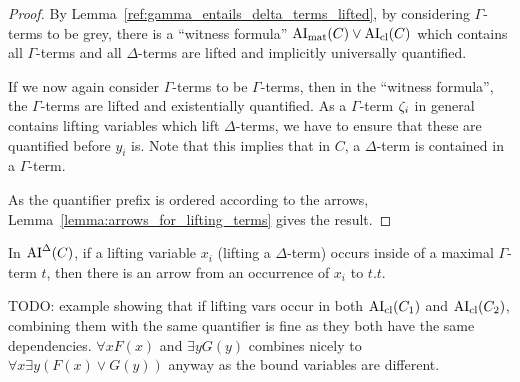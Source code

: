 \documentclass[,%
	paper=a4,%
	DIV12, %
	twoside=false,%
	liststotoc,
	bibtotoc,
	draft=false,%
	numbers=noendperiod
]{scrartcl}
\begin{document}
\begin{proof}
\begin{comment}
				$\Gamma \entails Q_1' z_1' \dots Q_{m'}' z_{m'}' \Big( \AImatrix(C_2) \lor \clauseTwoPrime \lor {\lnot (l{\fromclause'})_\Gamma} \Big)$
				\bigskip


				By the previous proof:

				$\Gamma \stackrel{\markA}\entails Q_1 z_1 \dots Q_m z_m \Big(\lifboth{\AImatrix(C_1)\sigma}\tau \lor \lifboth{\clauseOnePrime\sigma}\tau \lor \lifboth{(l{\fromclause})_\Gamma\sigma}\tau \Big)$

				$\Gamma \stackrel{\markB}\entails Q_1' z_1' \dots Q_{m'}' z_{m'}' \Big(  \lifboth{\AImatrix(C_2)\sigma}\tau \lor \lifboth{\clauseTwoPrime\sigma}\tau \lor \lnot \lifboth{(l{\fromclause'})_\Gamma\sigma}\tau \Big)$

		\end{description}
	\end{comment}

	By Lemma~\ref{ref:gamma_entails_delta_terms_lifted}, by considering $\Gamma$-terms to be grey, there is a ``witness formula'' 
	$\operatorname{AI}_\mathrm{mat}(C) \lor \operatorname{AI}_\mathrm{cl}(C)$ which contains all $\Gamma$-terms and all $\Delta$-terms are lifted and implicitly universally quantified.

	If we now again consider $\Gamma$-terms to be $\Gamma$-terms, then in the ``witness formula'', the $\Gamma$-terms are lifted and existentially quantified.
	As a $\Gamma$-term $\zeta_{i}$ in general contains lifting variables which lift $\Delta$-terms, we have to ensure that these are quantified before $y_i$ is.
	Note that this implies that in $C$, a $\Delta$-term is contained in a $\Gamma$-term.

	As the quantifier prefix is ordered according to the arrows, Lemma~\ref{lemma:arrows_for_lifting_terms} gives the result. 
\end{proof}

\begin{conj}
	\label{lemma:arrows_for_lifting_terms}
	In $\operatorname{AI}^\Delta(C)$, if a lifting variable $x_i$ (lifting a $\Delta$-term)
	occurs inside of a maximal $\Gamma$-term $t$, 
	then there is an arrow from an occurrence of $x_i$ to $t$.$t$.
\end{conj}

\begin{exa}
	TODO: example showing that if lifting vars occur in both $\operatorname{AI}_\mathrm{cl}(C_1)$ and $\operatorname{AI}_\mathrm{cl}(C_2)$, combining them with the same quantifier is fine as they both have the same dependencies. $\forall x F(x)$ and $\exists y G(y)$ combines nicely to $\forall x\exists y (F(x) \lor G(y))$ anyway as the bound variables are different.
\end{exa}
\end{document}
